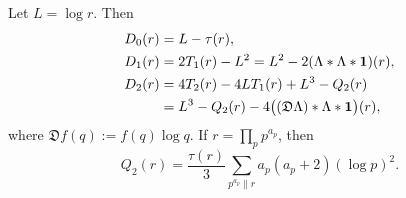 \begin{proposition}
\label{prop:taylor-first-three-jets}
Let $L=\log r$.  Then
\begin{align}
 D_0(r)&=L-\tau(r),
 \label{eq:taylor-D0-basic}\\
 D_1(r)&=2T_1(r)-L^2
        =L^2-2(\Lambda*\Lambda*\mathbf 1)(r),
 \label{eq:taylor-D1-convolution}\\
 D_2(r)&=4T_2(r)-4LT_1(r)+L^3-Q_2(r)
 \notag\\
 &=L^3-Q_2(r)
   -4\bigl((\mathfrak D\Lambda)*\Lambda*\mathbf 1\bigr)(r),
 \label{eq:taylor-D2-convolution}
\end{align}
where $\mathfrak D f(q):=f(q)\log q$.  If
$r=\prod_p p^{a_p}$, then
\begin{equation}
 Q_2(r)
 =\frac{\tau(r)}{3}
   \sum_{p^{a_p}\parallel r}a_p(a_p+2)(\log p)^2.
 \label{eq:taylor-Q2-prime-factorization}
\end{equation}
\end{proposition}

